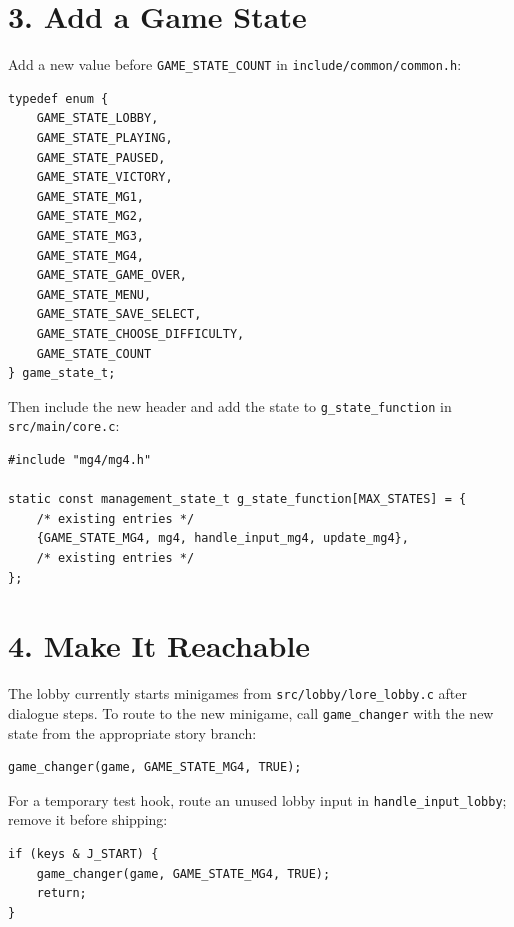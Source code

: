 \section{3. Add a Game State}

Add a new value before \texttt{GAME\_STATE\_COUNT} in \texttt{include/common/common.h}:

\begin{lstlisting}[caption={Add a state value}]
typedef enum {
    GAME_STATE_LOBBY,
    GAME_STATE_PLAYING,
    GAME_STATE_PAUSED,
    GAME_STATE_VICTORY,
    GAME_STATE_MG1,
    GAME_STATE_MG2,
    GAME_STATE_MG3,
    GAME_STATE_MG4,
    GAME_STATE_GAME_OVER,
    GAME_STATE_MENU,
    GAME_STATE_SAVE_SELECT,
    GAME_STATE_CHOOSE_DIFFICULTY,
    GAME_STATE_COUNT
} game_state_t;
\end{lstlisting}

Then include the new header and add the state to \texttt{g\_state\_function} in \texttt{src/main/core.c}:

\begin{lstlisting}[caption={Register scene callbacks}]
#include "mg4/mg4.h"

static const management_state_t g_state_function[MAX_STATES] = {
    /* existing entries */
    {GAME_STATE_MG4, mg4, handle_input_mg4, update_mg4},
    /* existing entries */
};
\end{lstlisting}

\section{4. Make It Reachable}

The lobby currently starts minigames from \texttt{src/lobby/lore\_lobby.c} after dialogue steps. To route to the new minigame, call \texttt{game\_changer} with the new state from the appropriate story branch:

\begin{lstlisting}[caption={Enter the new minigame from lore}]
game_changer(game, GAME_STATE_MG4, TRUE);
\end{lstlisting}

For a temporary test hook, route an unused lobby input in \texttt{handle\_input\_lobby}; remove it before shipping:

\begin{lstlisting}[caption={Temporary debug entry point}]
if (keys & J_START) {
    game_changer(game, GAME_STATE_MG4, TRUE);
    return;
}
\end{lstlisting}

